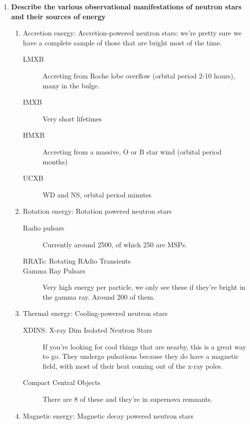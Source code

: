 \documentclass[a4paper]{article}
\begin{document}
\begin{enumerate}
\begin{description}
\end{description}

\item \textbf{Describe the various observational manifestations of neutron stars and their sources of energy}

\begin{enumerate}

\item Accretion energy: Accretion-powered neutron stars: we're pretty sure we have a complete sample of those that are bright most of the time. 
\begin{description}
\item[LMXB] Accreting from Roche lobe overflow (orbital period 2-10 hours), many in the bulge.
\item[IMXB] Very short lifetimes
\item[HMXB] Accreting from a massive, O or B star wind (orbital period months)
\item[UCXB] WD and NS, orbital period minutes
\end{description}

\item Rotation energy: Rotation powered neutron stars

\begin{description}
\item[Radio pulsars] Currently around 2500, of which 250 are MSPs. 
\item[RRATs: Rotating RAdio Transients] 
\item[Gamma Ray Pulsars] Very high energy per particle, we only see these if they're bright in the gamma ray. Around 200 of them. 
\end{description}

\item Thermal energy: Cooling-powered neutron stars

\begin{description}
\item[XDINS: X-ray Dim Isolated Neutron Stars] If you're looking for cool things that are nearby, this is a great way to go. They undergo pulsations because they do have a magnetic field, with most of their heat coming out of the x-ray poles.  
\item[Compact Central Objects] There are 8 of these and they're in supernova remnants. 
\end{description}

\item Magnetic energy: Magnetic decay powered neutron stars


\end{enumerate}
\end{enumerate}
\end{document}
